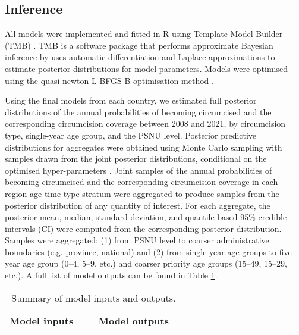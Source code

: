\documentclass{article}
\begin{document}
\begin{appendix}
\subsection{Inference}
\label{sec::inference}


All models were implemented and fitted in R \cite{rcore} using Template Model Builder (TMB) \cite{kristensen2016tmb}. TMB is a software package that performs approximate Bayesian inference by uses automatic differentiation and Laplace approximations to estimate posterior distributions for model parameters. Models were optimised using the {\color{red}quasi-newton L-BFGS-B} optimisation method \cite{byrd1995limited}.

Using the final models from each country, we estimated full posterior distributions of the annual probabilities of becoming circumcised and the corresponding circumcision coverage {\color{red}between 2008 and 2021}, by circumcision type, single-year age group, and the PSNU level. Posterior predictive distributions for aggregates were obtained using Monte Carlo sampling with samples drawn from the joint posterior distributions, conditional on the optimised hyper-parameters \cite{eaton2021naomi}. Joint samples of the annual probabilities of becoming circumcised and the corresponding circumcision coverage in each region-age-time-type stratum were aggregated to produce samples from the posterior distribution of any quantity of interest. For each aggregate, the posterior mean, median, standard deviation, and quantile-based 95\% credible intervals (CI) were computed from the corresponding posterior distribution. Samples were aggregated: (1) from PSNU level to coarser administrative boundaries (e.g. province, national) and (2) from single-year age groups to five-year age group (0--4, 5--9, etc.) and coarser priority age groups (15--49, 15--29, etc.). A full list of model outputs can be found in Table \ref{tab::inputsoutputs}.

{\linespread{1} 
\begin{table}[H]
	\small
	\centering	
	\caption{Summary of model inputs and outputs.}
    \label{tab::inputsoutputs}
	\begin{tabular}{| p{0.45\linewidth} | p{0.45\linewidth} |}
		\hline

			\textbf{\underline{Model inputs}} & \textbf{\underline{Model outputs}} \\
			

\end{tabular}
\end{table}}
\end{appendix}
\end{document}

